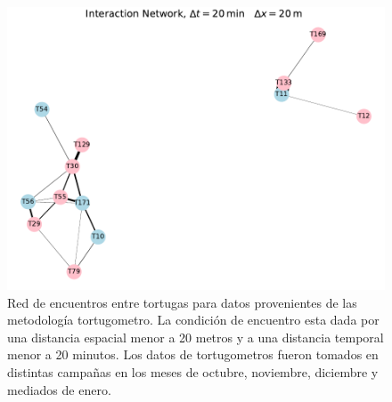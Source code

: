 \begin{figure}[ht]
    \begin{center}
       
   
    \includegraphics[width=\imsize]{Chap2/red_interaccion_20min_campanas.pdf}
\end{center}
    \caption[Red de encuentros entre tortugas  con datos tomados por el tortugometro.]{Red de encuentros entre tortugas para datos provenientes de las metodología  tortugometro. La condición de encuentro esta dada por una distancia espacial menor a 20 metros y a una distancia temporal menor a 20 minutos. Los datos de tortugometros fueron tomados en distintas campañas en los meses de octubre, noviembre, diciembre y mediados de enero.}
    \label{fig:redInteraccion20mincampanas}
\end{figure}



